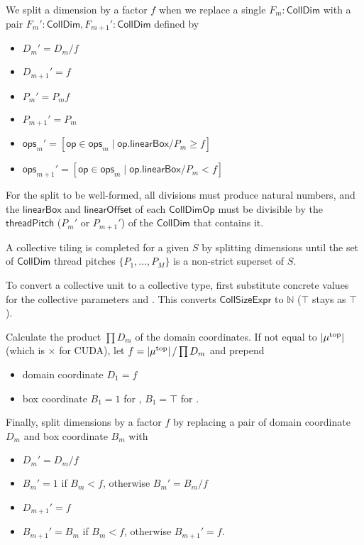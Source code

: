 \filbreak
We split a dimension by a factor $f$ when we replace a single $F_m: \mathsf{CollDim}$ with a pair $F_m': \mathsf{CollDim}, F_{m+1}': \mathsf{CollDim}$ defined by
\begin{itemize}
  \item $D_m' = D_m / f$
  \filbreak
  \item $D_{m+1}' = f$
  \filbreak
  \item $P_m' = P_m f$
  \filbreak
  \item $P_{m+1}' = P_m$
  \filbreak
  \item $\mathsf{ops}_m' = [\mathsf{op} \in \mathsf{ops}_m \mid \mathsf{op.linearBox} / P_m \ge f]$
  \filbreak
  \item $\mathsf{ops}_{m+1}' = [\mathsf{op} \in \mathsf{ops}_m \mid \mathsf{op.linearBox} / P_m < f]$
\end{itemize}
\filbreak
For the split to be well-formed, all divisions must produce natural numbers, and the $\mathsf{linearBox}$ and $\mathsf{linearOffset}$ of each $\mathsf{CollDimOp}$ must be divisible by the $\mathsf{threadPitch}$ ($P_m'$ or $P_{m+1}'$) of the $\mathsf{CollDim}$ that contains it.

\filbreak
A collective tiling is completed for a given  $S$ by splitting dimensions until the set of $\mathsf{CollDim}$ thread pitches $\{P_1, ..., P_M\}$ is a non-strict superset of $S$.

\filbreak
{}

To convert a collective unit to a collective type, first substitute concrete values for the collective parameters  and .
This converts $\mathsf{CollSizeExpr}$ to $\mathbb{N}$ ($\top$ stays as $\top$).

Calculate the product $\prod D_m$ of the domain coordinates.
If not equal to $\left \vert \mu^\text{top} \right\vert$ (which is  $\times$  for CUDA), let $f = \left \vert \mu^\text{top} \right\vert / \prod D_m$ and prepend
\begin{itemize}
  \item domain coordinate $D_1 = f$
  \filbreak
  \item box coordinate $B_1 = 1$ for , $B_1 = \top$ for .
\end{itemize}
\filbreak
Finally, split dimensions by a factor $f$ by replacing a pair of domain coordinate $D_m$ and box coordinate $B_m$ with
\begin{itemize}
  \item $D_m' = D_m / f$
  \filbreak
  \item $B_m' = 1$ if $B_m < f$, otherwise $B_m' = B_m / f$
  \filbreak
  \item $D_{m+1}' = f$
  \filbreak
  \item $B_{m+1}' = B_m$ if $B_m < f$, otherwise $B_{m+1}' = f$.
\end{itemize}

